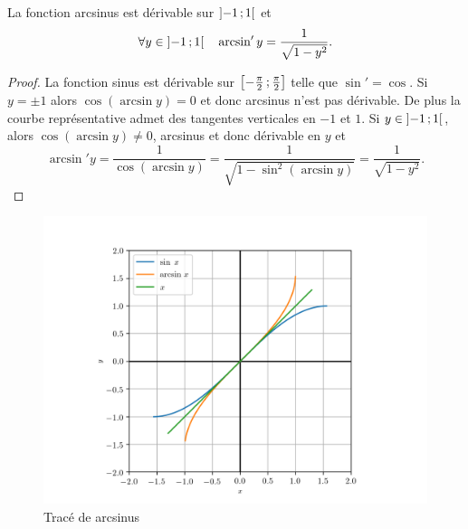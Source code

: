 %
\begin{prop}
  La fonction arcsinus est dérivable sur $\left] -1 \, ;  1 \right[$ et
  \begin{equation}
    \forall y \in \left] -1 \, ;  1 \right[ \quad \arcsin'y = \frac{1}{\sqrt{1-y^2}}.
  \end{equation}
\end{prop}
\begin{proof}
  La fonction sinus est dérivable sur $\left[ -\frac{\pi}{2} \, ;  \frac{\pi}{2} \right]$ telle que $\sin'=\cos$. Si $y=\pm 1$ alors $\cos(\arcsin y)=0$ et donc arcsinus n'est pas dérivable. De plus la courbe représentative admet des tangentes verticales en $-1$ et $1$. Si $y \in \left] -1 \, ;  1 \right[$, alors $\cos(\arcsin y) \neq 0$, arcsinus et donc dérivable en $y$ et
  \begin{equation}
    \arcsin' y = \frac{1}{\cos( \arcsin y)}=\frac{1}{\sqrt{1-\sin^2(\arcsin y)}}=\frac{1}{\sqrt{1-y^2}}.
  \end{equation}
\end{proof}
\begin{figure}
  \centering
  \includegraphics[scale=0.6]{arcsin.png}
  \caption{Tracé de arcsinus}
  \label{fig:tracearcsinus}
\end{figure}
%

